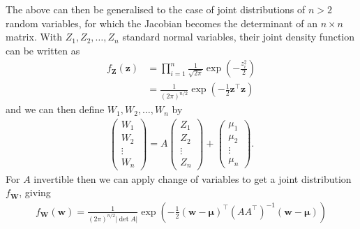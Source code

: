 \documentclass{tikzposter} %
\newtheorem{theorem}{Theorem}
\begin{document}
\begin{columns}
{The above can then be generalised to the case of joint distributions of $n > 2$ random variables, for which the Jacobian becomes the determinant of an $n \times n$ matrix. With $Z_{1}, Z_{2}, \dots, Z_{n}$ standard normal variables, their joint density function can be written as
\begin{align*}
  f_{\bm{Z}}(\bm{z}) &= \prod_{i=1}^{n} \frac{1}{\sqrt{2\pi}} \exp\left(-\frac{z_{i}^{2}}{2}\right) \\
  &= \frac{1}{(2\pi)^{n/2}} \exp\left(-\frac{1}{2}\bm{z}^{\top}\bm{z}\right)
\end{align*}
and we can then define $W_{1}, W_{2}, \dots, W_{n}$ by
\begin{align*}
  \begin{pmatrix}
    W_{1} \\ W_{2} \\ \vdots \\ W_{n}
  \end{pmatrix}
  = A \begin{pmatrix}
        Z_{1} \\ Z_{2} \\ \vdots \\ Z_{n}
      \end{pmatrix}
  + \begin{pmatrix}
      \mu_{1} \\ \mu_{2} \\ \vdots \\ \mu_{n}
    \end{pmatrix}.
\end{align*}
For $A$ invertible then we can apply change of variables to get a joint distribution $f_{\bm{W}}$, giving
\begin{align*}
f_{\bm{W}}(\bm{w}) = \frac{1}{(2\pi)^{n/2}|\det A|} \exp\left(-\frac{1}{2} (\bm{w}-\bm{\mu})^{\top}(AA^{\top})^{-1}(\bm{w}-\bm{\mu})\right)
\end{align*}
}

\end{columns}
\end{document}

